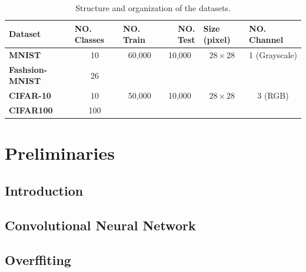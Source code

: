 \begin{table}[]
  \label{dataset_table}
  \begin{tabular}{
      l |
      c
      c
      c
      c
      c}
    \hline
    {\textbf{Dataset}}        & \multicolumn{1}{l}{{\textbf{NO. Classes}}} & \multicolumn{1}{l}{{\textbf{NO. Train}}} & \multicolumn{1}{r}{{\textbf{NO. Test}}} & \multicolumn{1}{l}{{\textbf{Size (pixel)}}} & \multicolumn{1}{l}{{\textbf{NO. Channel}}} \\ \hline
    {\textbf{MNIST}}          & 10                                         & 60,000                                   & 10,000                                  & $28\times28$                                & 1 (Grayscale)                              \\
    {\textbf{Fashsion-MNIST}} & 26                                         &                                          &                                         &                                             &                                            \\
    {\textbf{CIFAR-10}}       & 10                                         & 50,000                                   & 10,000                                  & $28\times28$                                & 3 (RGB)                                    \\
    {\textbf{CIFAR100}}       & 100                                        &                                          &                                         &                                             &                                            \\ \hline
  \end{tabular}
  \caption{Structure and organization of the datasets.}
\end{table}


\chapter{Preliminaries}
\section{Introduction}
\section{Convolutional Neural Network}
\section{Overffiting}


